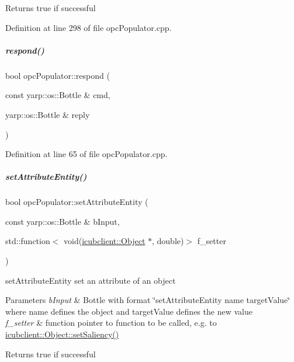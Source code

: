 \begin{DoxyReturn}{Returns}
true if successful 
\end{DoxyReturn}


Definition at line 298 of file opc\+Populator.\+cpp.

\mbox{\label{group__opcPopulator_ab8b7466e7e126e6604711824986ec0ac}} 
\subparagraph{\texorpdfstring{respond()}{respond()}}
{\footnotesize\ttfamily bool opc\+Populator\+::respond (\begin{DoxyParamCaption}\item[{const yarp\+::os\+::\+Bottle \&}]{cmd,  }\item[{yarp\+::os\+::\+Bottle \&}]{reply }\end{DoxyParamCaption})}



Definition at line 65 of file opc\+Populator.\+cpp.

\mbox{\label{group__opcPopulator_a2af2bb944aa9801c0ad8634cdffee498}} 
\subparagraph{\texorpdfstring{set\+Attribute\+Entity()}{setAttributeEntity()}}
{\footnotesize\ttfamily bool opc\+Populator\+::set\+Attribute\+Entity (\begin{DoxyParamCaption}\item[{const yarp\+::os\+::\+Bottle \&}]{b\+Input,  }\item[{std\+::function$<$ void(\hyperlink{group__icubclient__representations_classicubclient_1_1Object}{icubclient\+::\+Object} $\ast$, double)$>$}]{f\+\_\+setter }\end{DoxyParamCaption})}



set\+Attribute\+Entity set an attribute of an object 


\begin{DoxyParams}{Parameters}
{\em b\+Input} & Bottle with format \char`\"{}set\+Attribute\+Entity name target\+Value\char`\"{} where name defines the object and target\+Value defines the new value \\
\hline
{\em f\+\_\+setter} & function pointer to function to be called, e.\+g. to \hyperlink{group__icubclient__representations_ae2d186d50a741b1d2c90ad5172268de8}{icubclient\+::\+Object\+::set\+Saliency()} \\
\hline
\end{DoxyParams}
\begin{DoxyReturn}{Returns}
true if successful 
\end{DoxyReturn}


